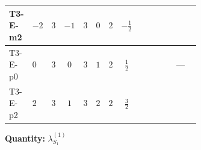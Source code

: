 \documentclass[8pt]{article}
\begin{document}
\begin{landscape}
\begin{longtable}{@{}llcccccc >{\raggedright\arraybackslash}p{0.21\linewidth} >{\raggedright\arraybackslash}p{0.21\linewidth} >{\raggedright\arraybackslash}p{0.21\linewidth}@{}}
\midrule
T3-E-m2 & $-2$ & $3$ & $-1$ & $3$ & $0$ & $2$ & $-\frac{1}{2}$ & \scriptsize\adjustbox{max width=\linewidth}{$\begin{gathered} +2 {\lambda_{S_1}^{(A)}} T_{\nu}^{(1)}\end{gathered}$} & \scriptsize\adjustbox{max width=\linewidth}{$\begin{gathered} +21 {g_2}^4\end{gathered}$} & \scriptsize\adjustbox{max width=\linewidth}{$\begin{gathered} +{g_1}^2 \left(12 {g_2}^2-12 {\lambda_{S_1}^{(1)}}-6 {\lambda_{S_1}^{(A)}}\right)\end{gathered}$} \\
\midrule
T3-E-p0 & $0$ & $3$ & $0$ & $3$ & $1$ & $2$ & $\frac{1}{2}$ & \scriptsize\adjustbox{max width=\linewidth}{$\begin{gathered} +2 {\lambda_{S_1}^{(A)}} T_{\nu}^{(1)}\end{gathered}$} & \scriptsize\adjustbox{max width=\linewidth}{$\begin{gathered} +21 {g_2}^4\end{gathered}$} & --- \\
\midrule
T3-E-p2 & $2$ & $3$ & $1$ & $3$ & $2$ & $2$ & $\frac{3}{2}$ & \scriptsize\adjustbox{max width=\linewidth}{$\begin{gathered} +2 {\lambda_{S_1}^{(A)}} T_{\nu}^{(1)}\end{gathered}$} & \scriptsize\adjustbox{max width=\linewidth}{$\begin{gathered} +21 {g_2}^4\end{gathered}$} & \scriptsize\adjustbox{max width=\linewidth}{$\begin{gathered} +{g_1}^2 \left(12 {g_2}^2-12 {\lambda_{S_1}^{(1)}}-6 {\lambda_{S_1}^{(A)}}\right)\end{gathered}$} \\
\midrule
\bottomrule
\end{longtable}
\clearpage
\noindent\textbf{Quantity: }$\lambda_{S_1}^{(1)}$\par\smallskip

\end{landscape}
\end{document}
